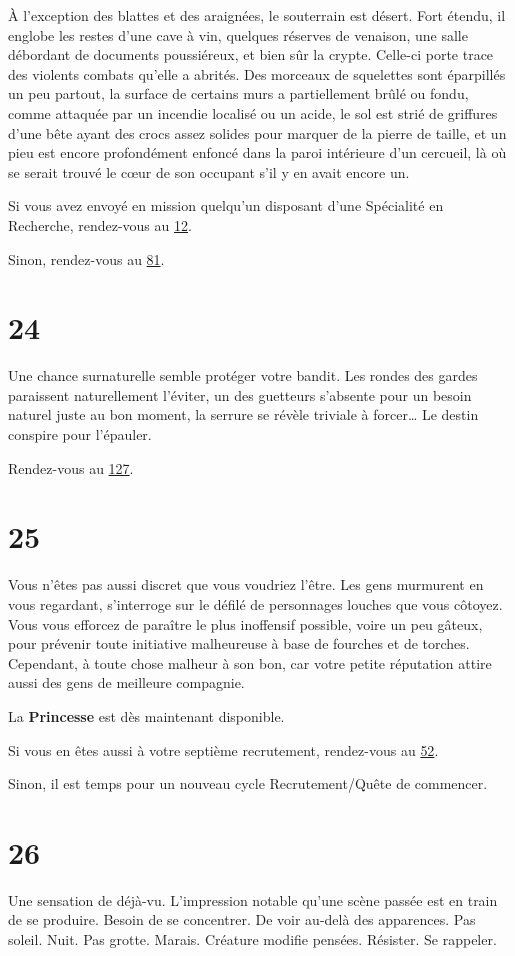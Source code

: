 \documentclass{report}
\newcommand{\gsection}[1]{
    \section{#1}
    \label{section-#1}
}
\newcommand{\glink}[1]{\hyperref[section-#1]{#1}}
\newcommand{\hero}[1]{\textbf{#1}}
\begin{document}
À l'exception des blattes et des araignées, le souterrain est désert. Fort étendu, il englobe les restes d'une cave à vin, quelques réserves de venaison, une salle débordant de documents poussiéreux, et bien sûr la crypte. Celle-ci porte trace des violents combats qu'elle a abrités. Des morceaux de squelettes sont éparpillés un peu partout, la surface de certains murs a partiellement brûlé ou fondu, comme attaquée par un incendie localisé ou un acide, le sol est strié de griffures d'une bête ayant des crocs assez solides pour marquer de la pierre de taille, et un pieu est encore profondément enfoncé dans la paroi intérieure d'un cercueil, là où se serait trouvé le cœur de son occupant s'il y en avait encore un.

Si vous avez envoyé en mission quelqu'un disposant d'une Spécialité en Recherche, rendez-vous au \glink{12}.

Sinon, rendez-vous au \glink{81}.

\gsection{24}

Une chance surnaturelle semble protéger votre bandit. Les rondes des gardes paraissent naturellement l'éviter, un des guetteurs s'absente pour un besoin naturel juste au bon moment, la serrure se révèle triviale à forcer… Le destin conspire pour l'épauler.

Rendez-vous au \glink{127}.

\gsection{25}

Vous n'êtes pas aussi discret que vous voudriez l'être. Les gens murmurent en vous regardant, s'interroge sur le défilé de personnages louches que vous côtoyez. Vous vous efforcez de paraître le plus inoffensif possible, voire un peu gâteux, pour prévenir toute initiative malheureuse à base de fourches et de torches.
Cependant, à toute chose malheur à son bon, car votre petite réputation attire aussi des gens de meilleure compagnie.

La \hero{Princesse} est dès maintenant disponible.

Si vous en êtes aussi à votre septième recrutement, rendez-vous au \glink{52}.

Sinon, il est temps pour un nouveau cycle Recrutement/Quête de commencer.

\gsection{26}

Une sensation de déjà-vu. L'impression notable qu'une scène passée est en train de se produire. Besoin de se concentrer. De voir au-delà des apparences. Pas soleil. Nuit. Pas grotte. Marais. Créature modifie pensées. Résister. Se rappeler.
\end{document}
